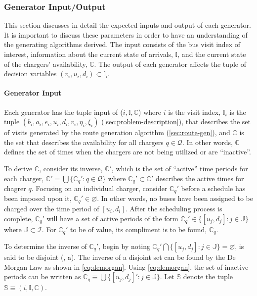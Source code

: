 \documentclass[11pt,a4paper,final]{article}
\newcommand{\visit}{(b_i, a_i, e_i, u_i, d_i, v_i, \eta_i, \xi_i)}
\newcommand{\I}{\mathbb{I}}                 %
\newcommand{\C}{\mathbb{C}}                 %
\newcommand{\Sol}{\mathbb{S}}               %
\newcommand{\Qset}{\mathcal{Q}}             %
\newcommand{\Jsetq}{\mathbb{J}}             %
\begin{document}
\subsubsection{Generator Input/Output}
\label{sec:generator-input-output}
This section discusses in detail the expected inputs and output of each generator. It is important to discuss these
parameters in order to have an understanding of the generating algorithms derived. The input consists of the bus visit
index of interest, information about the current state of arrivals, \(\I\), and the current state of the chargers'
availability, \(\C\). The output of each generator affects the tuple of decision variables \((v_i, u_i, d_i) \subset \I_i\).

\paragraph{Generator Input}
\label{sec:org6bd350b}
Each generator has the tuple input of (\(i, \I, \C\)) where \(i\) is the visit index, \(\I_i\) is the tuple \(\visit\)
(\ref{sec:problem-description}), that describes the set of visits generated by the route generation algorithm
(\ref{sec:route-gen}), and \(\C\) is the set that describes the availability for all chargers \(q \in \Qset\). In other words, \(\C\)
defines the set of times when the chargers are not being utilized or are ``inactive''.

To derive \(\C\), consider its inverse, \(\C'\), which is the set of ``active'' time periods for each charger, \(\C' = \bigcup
\{\C_q' : q \in \mathcal{Q}\}\) where \(\C_q' \subset \C'\) describes the active times for chagrer \(q\). Focusing on an individual charger,
consider \(\C_q'\) before a schedule has been imposed upon it, \(\C_q' \in \varnothing\). In other words, no buses have been
assigned to be charged over the time period of \([u_i, d_i]\). After the scheduling process is complete, \(\C_q'\) will have
a set of active periods of the form \(\C_q' \in \{[u_j, d_j]: j \in \Jsetq \}\) where \(\Jsetq \subset \mathcal{I}\). For \(\C_q'\) to be of
value, its compliment is to be found, \(\C_q\).

To determine the inverse of \(\C_q'\), begin by noting \(\C_q' \bigcap \{[u_j, d_j] : j \in \Jsetq\} = \varnothing\), is said to be
disjoint (, a). The inverse of a disjoint set can be found by the De Morgan Law as shown in
\ref{eq:demorgan}. Using \ref{eq:demorgan}, the set of inactive periods can be written as \(\C_q \equiv \bigcup \{[u_j, d_j]': j \in \Jsetq\}\).
Let \(\Sol\) denote the tuple \(\Sol \equiv (i, \I, \C)\).
\end{document}
